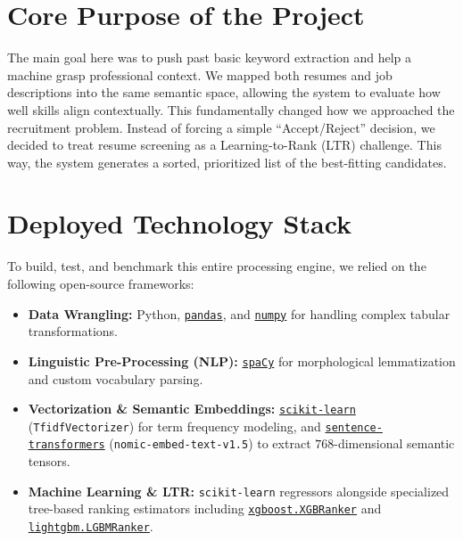 \documentclass[12pt,a4paper,oneside]{report}
\begin{document}
\section{Core Purpose of the Project}
The main goal here was to push past basic keyword extraction and help a machine grasp professional context. We mapped both resumes and job descriptions into the same semantic space, allowing the system to evaluate how well skills align contextually. This fundamentally changed how we approached the recruitment problem. Instead of forcing a simple ``Accept/Reject'' decision, we decided to treat resume screening as a Learning-to-Rank (LTR) challenge. This way, the system generates a sorted, prioritized list of the best-fitting candidates.

\section{Deployed Technology Stack}
To build, test, and benchmark this entire processing engine, we relied on the following open-source frameworks:
\begin{itemize}
    \item \textbf{Data Wrangling:} Python, \href{https://pandas.pydata.org/}{\texttt{pandas}}, and \href{https://numpy.org/}{\texttt{numpy}} for handling complex tabular transformations.
    \item \textbf{Linguistic Pre-Processing (NLP):} \href{https://spacy.io/}{\texttt{spaCy}} for morphological lemmatization and custom vocabulary parsing.
    \item \textbf{Vectorization \& Semantic Embeddings:} \href{https://scikit-learn.org/}{\texttt{scikit-learn}} (\texttt{TfidfVectorizer}) for term frequency modeling, and \href{https://sbert.net/}{\texttt{sentence-transformers}} (\texttt{nomic-embed-text-v1.5}) to extract $768$-dimensional semantic tensors.
    \item \textbf{Machine Learning \& LTR:} \texttt{scikit-learn} regressors alongside specialized tree-based ranking estimators including \href{https://xgboost.ai/}{\texttt{xgboost.XGBRanker}} and \href{https://lightgbm.readthedocs.io/}{\texttt{lightgbm.LGBMRanker}}.
\end{itemize}
\end{document}

